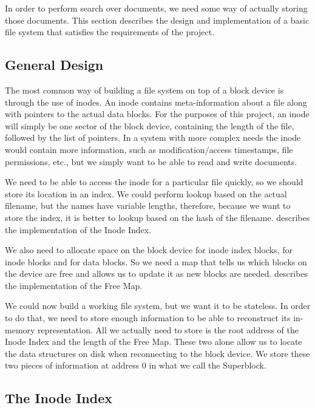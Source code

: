 \documentclass[12pt,a4paper,twoside,openright]{report}
\begin{document}
In order to perform search over documents, we need some way of actually storing those documents. This section describes the design and implementation of a basic file system that satisfies the requirements of the project.

\subsection{General Design}

The most common way of building a file system on top of a block device is through the use of inodes. An inode contains meta-information about a file along with pointers to the actual data blocks. For the purposes of this project, an inode will simply be one sector of the block device, containing the length of the file, followed by the list of pointers. In a system with more complex needs the inode would contain more information, such as modification/access timestamps, file permissions, etc., but we simply want to be able to read and write documents.

We need to be able to access the inode for a particular file quickly, so we should store its location in an index. We could perform lookup based on the actual filename, but the names have variable lengths, therefore, because we want to store the index, it is better to lookup based on the hash of the filename.  describes the implementation of the Inode Index.

We also need to allocate space on the block device for inode index blocks, for inode blocks and for data blocks. So we need a map that tells us which blocks on the device are free and allows us to update it as new blocks are needed.  describes the implementation of the Free Map.

We could now build a working file system, but we want it to be stateless. In order to do that, we need to store enough information to be able to reconstruct its in-memory representation. All we actually need to store is the root address of the Inode Index and the length of the Free Map. These two alone allow us to locate the data structures on disk when reconnecting to the block device. We store these two pieces of information at address 0 in what we call the Superblock.

\subsection{The Inode Index}
\label{subsec:inodeindex}
\end{document}
